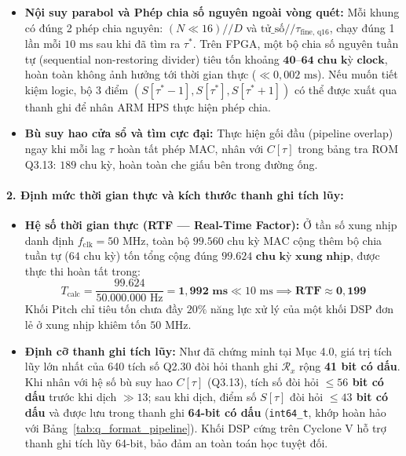 \documentclass[11pt,a4paper]{article}
\begin{document}
\begin{itemize}
    *(Ghi chú: Nếu hệ thống dùng 2 DSP song song, vừa nhân cửa sổ vừa dồn năng lượng $\mathcal{R}_x[0]$, số chu kỳ giảm bớt 640 chu kỳ xuống còn $98.920\text{ chu kỳ MAC}$, tương đương $1{,}978\text{ ms}$).*
    \item \textbf{Nội suy parabol và Phép chia số nguyên ngoài vòng quét:}
    Mỗi khung có đúng 2 phép chia nguyên: $(N \ll 16) // D$ và $\text{tử\_số} // \tau_{\text{fine, q16}}$, chạy đúng 1 lần mỗi $10\text{ ms}$ sau khi đã tìm ra $\tau^*$. Trên FPGA, một bộ chia số nguyên tuần tự (sequential non-restoring divider) tiêu tốn khoảng $\mathbf{40\text{--}64\text{ chu kỳ clock}}$, hoàn toàn không ảnh hưởng tới thời gian thực ($\ll 0{,}002\text{ ms}$). Nếu muốn tiết kiệm logic, bộ 3 điểm $(S[\tau^*-1], S[\tau^*], S[\tau^*+1])$ có thể được xuất qua thanh ghi để nhân ARM HPS thực hiện phép chia.
    \item \textbf{Bù suy hao cửa sổ và tìm cực đại:} Thực hiện gối đầu (pipeline overlap) ngay khi mỗi lag $\tau$ hoàn tất phép MAC, nhân với $C[\tau]$ trong bảng tra ROM Q3.13: $189\text{ chu kỳ}$, hoàn toàn che giấu bên trong đường ống.
\end{itemize}

\paragraph{2. Định mức thời gian thực và kích thước thanh ghi tích lũy:}
\begin{itemize}
    \setlength{\itemsep}{1pt}
    \item \textbf{Hệ số thời gian thực (RTF --- Real-Time Factor):} Ở tần số xung nhịp danh định $f_{\text{clk}} = 50\text{ MHz}$, toàn bộ $99.560\text{ chu kỳ MAC}$ cộng thêm bộ chia tuần tự ($64\text{ chu kỳ}$) tốn tổng cộng đúng $\mathbf{99.624\text{ chu kỳ xung nhịp}}$, được thực thi hoàn tất trong:
    \begin{equation}
    T_{\text{calc}} = \frac{99.624}{50.000.000\text{ Hz}} = \mathbf{1{,}992\text{ ms}} \ll 10\text{ ms} \implies \mathbf{\text{RTF} \approx 0{,}199}
    \end{equation}
    Khối Pitch chỉ tiêu tốn chưa đầy $20\%$ năng lực xử lý của một khối DSP đơn lẻ ở xung nhịp khiêm tốn $50\text{ MHz}$.
    \item \textbf{Định cỡ thanh ghi tích lũy:} Như đã chứng minh tại Mục 4.0, giá trị tích lũy lớn nhất của 640 tích số Q2.30 đòi hỏi thanh ghi $\mathcal{R}_x$ rộng \textbf{41 bit có dấu}. Khi nhân với hệ số bù suy hao $C[\tau]$ (Q3.13), tích số đòi hỏi \textbf{$\le 56$ bit có dấu} trước khi dịch $\gg 13$; sau khi dịch, điểm số $S[\tau]$ đòi hỏi \textbf{$\le 43$ bit có dấu} và được lưu trong thanh ghi \textbf{64-bit có dấu} (\texttt{int64\_t}, khớp hoàn hảo với Bảng~\ref{tab:q_format_pipeline}). Khối DSP cứng trên Cyclone V hỗ trợ thanh ghi tích lũy 64-bit, bảo đảm an toàn toán học tuyệt đối.
\end{itemize}
\end{document}
